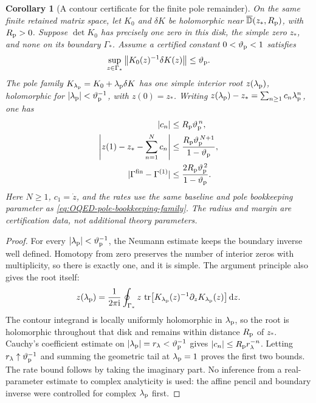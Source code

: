 \documentclass[final,5p,times,twocolumn,numbers,nopreprintline]{elsarticle}
\numberwithin{equation}{section}
\newtheorem{corollary}[theorem]{Corollary}
\theoremstyle{definition}
\theoremstyle{remark}
\newcommand{\dd}{\mathop{}\!\mathrm d}
\newcommand{\ii}{\mathrm i}
\newcommand{\Tr}{\operatorname{tr}}
\newcommand{\norm}[1]{\left\lVert #1\right\rVert}
\begin{document}
\begin{corollary}[A contour certificate for the finite pole remainder]
\label{cor:OQED-pole-Taylor-remainder}
On the same finite retained matrix space, let \(K_0\) and \(\delta K\)
be holomorphic near \(\overline{\mathbb D}(z_*,R_{\rm p})\),
with \(R_{\rm p}>0\).
Suppose \(\det K_0\) has precisely one zero in this disk, the simple
zero \(z_*\), and none on its boundary \(\Gamma_*\). Assume a
certified constant \(0<\vartheta_{\rm p}<1\) satisfies
\begin{equation}
 \sup_{z\in\Gamma_*}\norm{K_0(z)^{-1}\delta K(z)}
                    \leq\vartheta_{\rm p}.
 \label{eq:OQED-complex-pole-margin}
\end{equation}
The pole family \(K_{\lambda_{\rm p}}=K_0+\lambda_{\rm p}\delta K\)
has one simple interior root \(z(\lambda_{\rm p})\), holomorphic for
\(|\lambda_{\rm p}|<\vartheta_{\rm p}^{-1}\), with
\(z(0)=z_*\). Writing \(z(\lambda_{\rm p})-z_*
=\sum_{n\geq1}c_n\lambda_{\rm p}^n\), one has
\begin{equation}
 \begin{aligned}
  |c_n|&\leq R_{\rm p}\vartheta_{\rm p}^{\,n},\\
  \left|z(1)-z_*-\sum_{n=1}^{N}c_n\right|
     &\leq\frac{R_{\rm p}\vartheta_{\rm p}^{\,N+1}}
                    {1-\vartheta_{\rm p}},\\
  |\Gamma^{\rm fin}-\Gamma^{(1)}|
     &\leq\frac{2R_{\rm p}\vartheta_{\rm p}^{\,2}}
                    {1-\vartheta_{\rm p}}.
 \end{aligned}
 \label{eq:OQED-pole-remainder-certificate}
\end{equation}
Here \(N\geq1\), \(c_1=\dot z\), and the rates use the same
baseline and pole bookkeeping parameter as
\eqref{eq:OQED-pole-bookkeeping-family}. The radius and margin are
certification data, not additional theory parameters.
\end{corollary}
\begin{proof}
For every \(|\lambda_{\rm p}|<\vartheta_{\rm p}^{-1}\), the
Neumann estimate keeps the boundary inverse well defined. Homotopy
from zero preserves the number of interior zeros with multiplicity,
so there is exactly one, and it is simple. The argument principle
also gives the root itself:
\begin{equation}
 z(\lambda_{\rm p})=\frac1{2\pi\ii}\oint_{\Gamma_*}
 z\,\Tr\!\left[K_{\lambda_{\rm p}}(z)^{-1}
                    \partial_zK_{\lambda_{\rm p}}(z)\right]\dd z.
 \label{eq:OQED-pole-contour-moment}
\end{equation}
The contour integrand is locally uniformly holomorphic in
\(\lambda_{\rm p}\), so the root is holomorphic throughout that
disk and remains within distance \(R_{\rm p}\) of \(z_*\).
Cauchy's coefficient estimate on \(|\lambda_{\rm p}|=r_{\lambda}<\vartheta_{\rm p}^{-1}\) gives
\(|c_n|\leq R_{\rm p}r_{\lambda}^{-n}\). Letting
\(r_{\lambda}\uparrow\vartheta_{\rm p}^{-1}\) and summing the
geometric tail at \(\lambda_{\rm p}=1\) proves the first two
bounds. The rate bound follows by taking the imaginary part.
No inference from a real-parameter estimate to complex analyticity is
used: the affine pencil and boundary inverse were controlled for
complex \(\lambda_{\rm p}\) first.
\end{proof}
\end{document}
